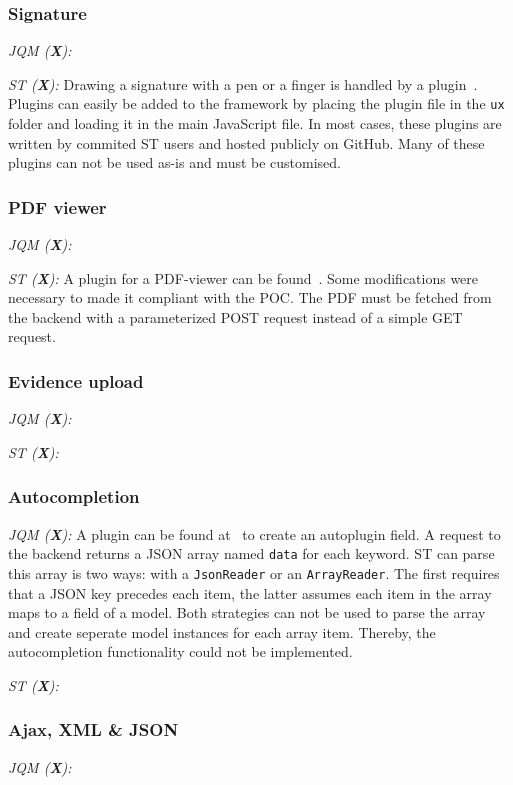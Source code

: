 \documentclass[a4paper]{artikel3}
\newcommand{\code}[1]{\texttt{#1}}
\newcommand{\framework}[2]{\emph{\MakeUppercase{#1} (\textbf{#2}): }} %
\begin{document}
\subsubsection{Signature}%
\framework{jQM}{X}

\framework{ST}{X}
Drawing a signature with a pen or a finger is handled by a plugin~\cite{SimFla2011}.  Plugins can easily be added to the framework by placing the plugin file in the \code{ux} folder and loading it in the main JavaScript file.  In most cases,  these plugins are written by commited ST users and hosted publicly on GitHub. Many of these plugins can not be used as-is and must be customised.

\subsubsection{PDF viewer}%
\framework{jQM}{X}

\framework{ST}{X}
A plugin for a PDF-viewer can be found~\cite{Fiedler2012}.  Some modifications were necessary to made it compliant with the POC.  The PDF must be fetched from the backend with a parameterized POST request instead of a simple GET request.  

\subsubsection{Evidence upload}
\framework{jQM}{X}

\framework{ST}{X}

\subsubsection{Autocompletion}
\framework{jQM}{X}
A plugin can be found at~\cite{Mysamplecode2012} to create an autoplugin field.  A request to the backend returns a JSON array named \code{data} for each keyword.  ST can parse this array is two ways:  with a \code{JsonReader} or an \code{ArrayReader}.  The first requires that a JSON key precedes each item,  the latter assumes each item in the array maps to a field of a model.  Both strategies can not be used to parse the array and create seperate model instances for each array item.  Thereby,  the autocompletion functionality could not be implemented.

\framework{ST}{X}

\subsubsection{Ajax, XML \& JSON}%
\framework{jQM}{X}
\end{document}
